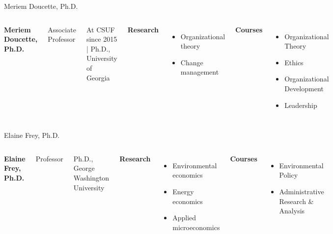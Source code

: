 \documentclass[10pt]{beamer}
\begin{document}
\begin{frame}{Meriem Doucette, Ph.D.}
\begin{columns}[T,onlytextwidth]
    \raggedright
    {\large\bfseries Meriem Doucette, Ph.D.}\par
    {Associate Professor}\par
    {\footnotesize At CSUF since 2015 \quad | \quad Ph.D., University of Georgia}\par\vspace{0.4em}

    \textbf{Research}
    \begin{itemize}
      \item Organizational theory
      \item Change management
    \end{itemize}

    \textbf{Courses}
    \begin{itemize}
      \item Organizational Theory
      \item Ethics
      \item Organizational Development
      \item Leadership
    \end{itemize}

    \vspace*{0.25cm}
\end{columns}
\end{frame}

\begin{frame}{Elaine Frey, Ph.D.}
\begin{columns}[T,onlytextwidth]
    \raggedright
    {\large\bfseries Elaine Frey, Ph.D.}\par
    {Professor}\par
    {\footnotesize Ph.D., George Washington University}\par\vspace{0.4em}

    \textbf{Research}
    \begin{itemize}
      \item Environmental economics
      \item Energy economics
      \item Applied microeconomics
    \end{itemize}

    \textbf{Courses}
    \begin{itemize}
      \item Environmental Policy
      \item Administrative Research \& Analysis
    \end{itemize}

    \vspace*{0.25cm}
\end{columns}
\end{frame}
\end{document}
